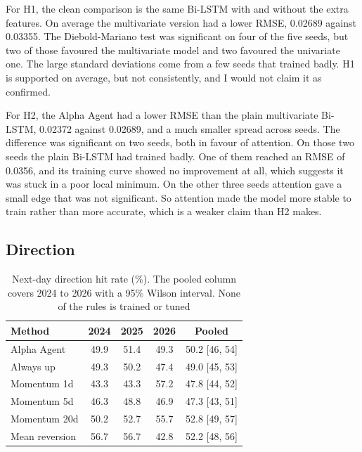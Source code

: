 For H1, the clean comparison is the same Bi-LSTM with and without the extra features. On average the multivariate version had a lower RMSE, 0.02689 against 0.03355. The Diebold-Mariano test was significant on four of the five seeds, but two of those favoured the multivariate model and two favoured the univariate one. The large standard deviations come from a few seeds that trained badly. H1 is supported on average, but not consistently, and I would not claim it as confirmed.

For H2, the Alpha Agent had a lower RMSE than the plain multivariate Bi-LSTM, 0.02372 against 0.02689, and a much smaller spread across seeds. The difference was significant on two seeds, both in favour of attention. On those two seeds the plain Bi-LSTM had trained badly. One of them reached an RMSE of 0.0356, and its training curve showed no improvement at all, which suggests it was stuck in a poor local minimum. On the other three seeds attention gave a small edge that was not significant. So attention made the model more stable to train rather than more accurate, which is a weaker claim than H2 makes.

\subsection{Direction}\label{sec:res-direction}

\begin{table}[!t]
  \centering
  \caption{Next-day direction hit rate (\%). The pooled column covers 2024 to 2026 with a 95\% Wilson interval. None of the rules is trained or tuned}
  \label{tab:direction}
  \footnotesize
  \setlength{\tabcolsep}{3.5pt}
  \begin{tabular}{@{}lcccc@{}}
    \toprule
    Method & 2024 & 2025 & 2026 & Pooled \\
    \midrule
    Alpha Agent    & 49.9 & 51.4 & 49.3 & 50.2 [46, 54] \\
    Always up      & 49.3 & 50.2 & 47.4 & 49.0 [45, 53] \\
    Momentum 1d    & 43.3 & 43.3 & 57.2 & 47.8 [44, 52] \\
    Momentum 5d    & 46.3 & 48.8 & 46.9 & 47.3 [43, 51] \\
    Momentum 20d   & 50.2 & 52.7 & 55.7 & 52.8 [49, 57] \\
    Mean reversion & 56.7 & 56.7 & 42.8 & 52.2 [48, 56] \\
    \bottomrule
  \end{tabular}
\end{table}

